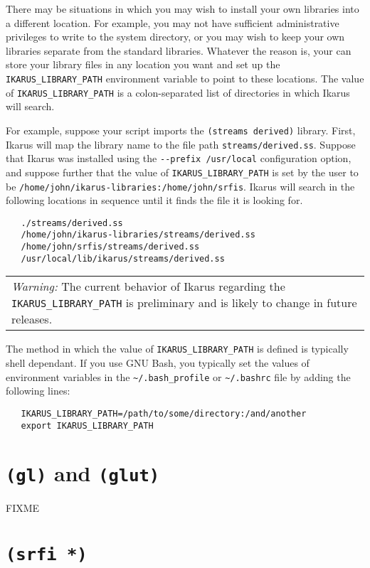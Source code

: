 \documentclass[onecolumn, 12pt, twoside, openright, dvipdfm]{book}
\newcommand{\BoxedText}[2]{
  \vspace{.05in}
  \begin{center}
    \begin{tabular}{|p{4.6in}|} {\large \emph{#1}} #2 \end{tabular}
  \end{center}
  \vspace{.05in}
}
\begin{document}
There may be situations in which you may wish to install your own
libraries into a different location.  For example, you may not have
sufficient administrative privileges to write to the system
directory, or you may wish to keep your own libraries separate from
the standard libraries.  Whatever the reason is, your can store your
library files in any location you want and set up the
\verb|IKARUS_LIBRARY_PATH| environment variable to point to these
locations.  The value of \verb|IKARUS_LIBRARY_PATH| is a
colon-separated list of directories in which Ikarus will search.

For example, suppose your script imports the
\texttt{(streams~derived)} library.  First, Ikarus will map the
library name to the file path \verb|streams/derived.ss|.  Suppose
that Ikarus was installed using the \verb|--prefix /usr/local|
configuration option, and suppose further that the value of
\verb|IKARUS_LIBRARY_PATH| is set by the user to be 
\verb|/home/john/ikarus-libraries:/home/john/srfis|.  Ikarus will
search in the following locations in sequence until it finds the
file it is looking for.

\begin{verbatim}
   ./streams/derived.ss
   /home/john/ikarus-libraries/streams/derived.ss
   /home/john/srfis/streams/derived.ss
   /usr/local/lib/ikarus/streams/derived.ss
\end{verbatim}

\BoxedText{Warning:}{The current behavior of Ikarus regarding the
\texttt{IKARUS\_LIBRARY\_PATH} is preliminary and is likely to change
in future releases.}

The method in which the value of \verb|IKARUS_LIBRARY_PATH| is
defined is typically shell dependant.  If you use GNU Bash, you
typically set the values of environment variables in the
\verb|~/.bash_profile| or \verb|~/.bashrc| file by adding the
following lines:

\begin{verbatim}
   IKARUS_LIBRARY_PATH=/path/to/some/directory:/and/another
   export IKARUS_LIBRARY_PATH
\end{verbatim}


\newpage


\section{\label{sec:aux-opengl}\texttt{(gl)} and \texttt{(glut)}}
FIXME
\newpage


\section{\texttt{(srfi *)}}
\end{document}
